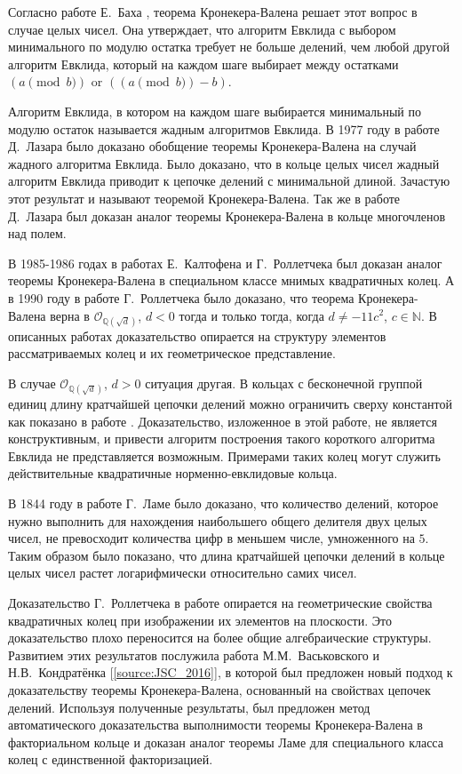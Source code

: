 \documentclass[_00_dissertation.tex]{subfiles}
\begin{document}
Согласно работе Е.~Баха \cite{source:Bach_Algorithmic_number_theory}, теорема Кронекера-Валена решает этот вопрос в случае целых чисел.
Она утверждает, что алгоритм Евклида с выбором минимального по модулю остатка требует не больше делений, чем любой другой алгоритм Евклида, который на каждом шаге выбирает между остатками $(a\pmod{b})$ or $((a\pmod{b})-b)$.

Алгоритм Евклида, в котором на каждом шаге выбирается минимальный по модулю остаток называется жадным алгоритмов Евклида.
В 1977 году в работе Д.~Лазара \cite{source:Lazard} было доказано обобщение теоремы Кронекера-Валена на случай жадного алгоритма Евклида.
Было доказано, что в кольце целых чисел жадный алгоритм Евклида приводит к цепочке делений с минимальной длиной.
Зачастую этот результат и называют теоремой Кронекера-Валена.
Так же в работе Д.~Лазара был доказан аналог теоремы Кронекера-Валена в кольце многочленов над полем.

В 1985-1986 годах в работах Е.~Калтофена и Г.~Роллетчека \cite{source:Kaltofen, source:Rolletschek_1986} был доказан аналог теоремы Кронекера-Валена в специальном классе мнимых квадратичных колец.
А в 1990 году в работе Г.~Роллетчека \cite{source:Rolletschek_1990} было доказано, что теорема Кронекера-Валена верна в $\mathcal{O}_{\mathbb{Q}(\sqrt{d})}$, $d < 0$ тогда и только тогда, когда $d \neq -11c^{2}$, $c \in \mathbb{N}$.
В описанных работах доказательство опирается на структуру элементов рассматриваемых колец и их геометрическое представление.

В случае $\mathcal{O}_{\mathbb{Q}(\sqrt{d})}$, $d > 0$ ситуация другая.
В кольцах с бесконечной группой единиц длину кратчайшей цепочки делений можно ограничить сверху константой как показано в работе \cite{source:Cooke}.
Доказательство, изложенное в этой работе, не является конструктивным, и привести алгоритм построения такого короткого алгоритма Евклида не представляется возможным.
Примерами таких колец могут служить действительные квадратичные норменно-евклидовые кольца.

В 1844 году в работе Г.~Ламе было доказано, что количество делений, которое нужно выполнить для нахождения наибольшего общего делителя двух целых чисел, не превосходит количества цифр в меньшем числе, умноженного на $5$.
Таким образом было показано, что длина кратчайшей цепочки делений в кольце целых чисел растет логарифмически относительно самих чисел.

Доказательство Г.~Роллетчека в работе \cite{source:Rolletschek_1990} опирается на геометрические свойства квадратичных колец при изображении их элементов на плоскости.
Это доказательство плохо переносится на более общие алгебраические структуры.
Развитием этих результатов послужила работа М.М.~Васьковского и Н.В.~Кондратёнка [\ref{source:JSC_2016}], в которой был предложен новый подход к доказательству теоремы Кронекера-Валена, основанный на свойствах цепочек делений.
Используя полученные результаты, был предложен метод автоматического доказательства выполнимости теоремы Кронекера-Валена в факториальном кольце и доказан аналог теоремы Ламе для специального класса колец с единственной факторизацией.
\end{document}
